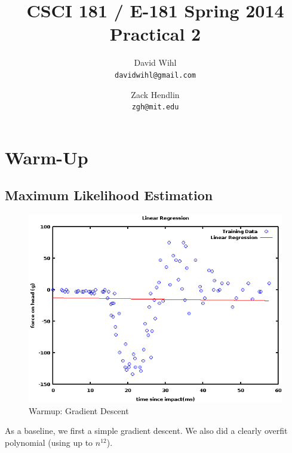 \documentclass[11pt, oneside]{article}   	%
\title{CSCI 181 / E-181 Spring 2014 Practical 2}
\author{
  David Wihl\\
  \texttt{davidwihl@gmail.com}
  \and
  Zack Hendlin\\
  \texttt{zgh@mit.edu}
}
\begin{document}
\maketitle
\section*{Warm-Up}




\subsection*{Maximum Likelihood Estimation}

\begin{figure}[h!] 
  \centering
  \includegraphics[scale=0.6]{gradient_descent}
  \caption{Warmup: Gradient Descent \label{gradientdescent}}
\end{figure}

As a baseline, we first a simple gradient descent. We also did a clearly overfit polynomial (using up to $n^12$).
\end{document}
